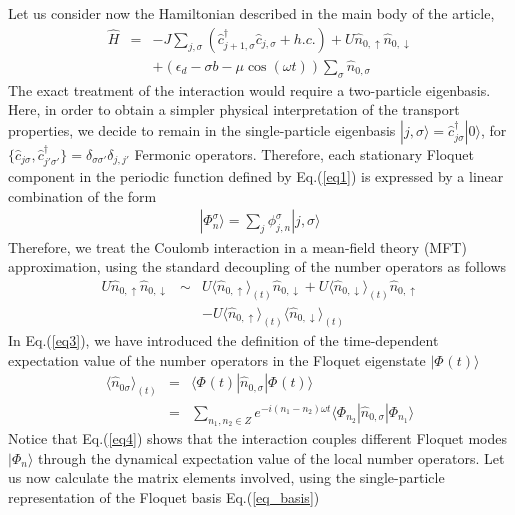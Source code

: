 \documentclass[aps,twocolumn,showpacs,floatfix,prl]{revtex4}
\begin{document}
Let us consider now the Hamiltonian described in the main body of the article,
\begin{eqnarray}
\hat{H} &=& -J\sum_{j,\sigma}\left( \hat{c}_{j+1,\sigma}^{\dagger}\hat{c}_{j,\sigma} + h.c.\right) + U\hat{n}_{0,\uparrow}\hat{n}_{0,\downarrow}\nonumber\\
&&
+ \left(\epsilon_d - \sigma b - \mu\cos(\omega t) \right)\sum_{\sigma}\hat{n}_{0,\sigma}
\label{eq2}
\end{eqnarray}
The exact treatment of the interaction would require a two-particle eigenbasis. Here, in order to obtain a simpler
physical interpretation of the transport properties, we decide to remain in the single-particle eigenbasis 
$|j,\sigma\rangle = \hat{c}^{\dagger}_{j\sigma}|0\rangle$, for $\{\hat{c}_{j\sigma},\hat{c}_{j'\sigma'}^{\dagger} \} = \delta_{\sigma\sigma'}\delta_{j,j'}$
Fermonic operators. Therefore, each stationary Floquet component in the periodic function defined by Eq.(\ref{eq1}) is expressed by a linear combination of the form
\begin{eqnarray}
|\Phi_{n}^{\sigma}\rangle = \sum_{j} \phi_{j,n}^{\sigma}|j,\sigma\rangle 
\label{eq_basis}
\end{eqnarray}
Therefore, we treat the Coulomb interaction in a mean-field theory (MFT) approximation, using the standard decoupling of the number operators
as follows
\begin{eqnarray}
U \hat{n}_{0,\uparrow}\hat{n}_{0,\downarrow} &\sim&  U \langle \hat{n}_{0,\uparrow}\rangle_{(t)}\hat{n}_{0,\downarrow} + U \langle \hat{n}_{0,\downarrow}\rangle_{(t)}\hat{n}_{0,\uparrow}\nonumber\\
&&- U   \langle \hat{n}_{0,\uparrow}\rangle_{(t)} \langle \hat{n}_{0,\downarrow}\rangle_{(t)}
\label{eq3}
\end{eqnarray}
In Eq.(\ref{eq3}), we have introduced the definition of the time-dependent expectation value of the number operators in the Floquet eigenstate $|\Phi_{}(t)\rangle$
\begin{eqnarray}
\langle \hat{n}_{0\sigma} \rangle_{(t)} &=& \langle \Phi_{}(t)|\hat{n}_{0,\sigma}|\Phi_{}(t)\rangle\nonumber\\
&=& \sum_{n_1,n_2\in Z} e^{-i(n_1 - n_2)\omega t}\langle \Phi_{n_2}^{}|
\hat{n}_{0,\sigma}|\Phi_{n_1}^{}\rangle
\label{eq4}
\end{eqnarray}
Notice that Eq.(\ref{eq4}) shows that the interaction couples different Floquet modes $|\Phi_{n}^{}\rangle$ through the dynamical expectation value
of the local number operators.
Let us now calculate the matrix elements involved, using the single-particle representation of the Floquet basis Eq.(\ref{eq_basis})
\end{document}
